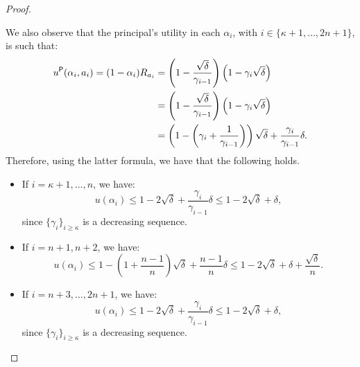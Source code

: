 \begin{proof}
\begin{enumerate}
		We also observe that the principal's utility in each $\alpha_i$, with $i \in \{\kappa+1, \dots, 2n+1\}$, is such that:
		\begin{align*}
			u^{\mathsf{P}}(\alpha_i, a_{i}) =  (1-\alpha_i) R_{a_i} & = \left(1 - \frac{\sqrt{\delta}}{\gamma_{i-1}}\right) \left(1-\gamma_i \sqrt{\delta} \right)\\
			& = \left(1 - \frac{\sqrt{\delta}}{\gamma_{i-1}}\right) \left(1-\gamma_i \sqrt{\delta} \right)\\
			& = \left( 1- \left(\gamma_i  + \frac{1}{\gamma_{i-1}}\right)\right) \sqrt{\delta} +  \frac{\gamma_{i}}{\gamma_{i-1}} \delta.
		\end{align*}
		Therefore, using the latter formula, we have that the following holds.
		\begin{itemize}
			\item If $i=\kappa +1,\dots,n$, we have:
			$$u(\alpha_i) \le 1- 2\sqrt{\delta} + \frac{\gamma_i}{\gamma_{i-1}}\delta \le  1 - 2\sqrt{\delta} + \delta, $$
			since $\{\gamma_i\}_{i \ge \kappa}$ is  a decreasing sequence.
			
			\item If $i=n+1,n+2$, we have:
			$$u(\alpha_{i}) \le 1- \left(1 + \frac{n-1}{n} \right)\sqrt{\delta} +  \frac{n-1}{n} \delta \le 1- 2\sqrt{\delta} + \delta + \frac{\sqrt{\delta}}{n}.$$
			
			\item If $i=n+3, \dots, 2n+1$, we have:
			$$u(\alpha_{i}) \le 1- 2\sqrt{\delta} + \frac{\gamma_i}{\gamma_{i-1}}\delta \le 1- 2\sqrt{\delta} + \delta ,$$
			since $\{\gamma_i\}_{i \ge \kappa}$ is  a decreasing sequence.
		\end{itemize}
		

\end{enumerate}
\end{proof}
